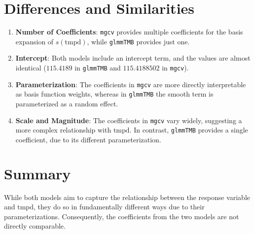 \documentclass{article}
\begin{document}
\section{Differences and Similarities}

\begin{enumerate}
    \item \textbf{Number of Coefficients}: \texttt{mgcv} provides multiple coefficients for the basis expansion of \( s(\text{tmpd}) \), while \texttt{glmmTMB} provides just one.
    \item \textbf{Intercept}: Both models include an intercept term, and the values are almost identical (\(115.4189\) in \texttt{glmmTMB} and \(115.4188502\) in \texttt{mgcv}).
    \item \textbf{Parameterization}: The coefficients in \texttt{mgcv} are more directly interpretable as basis function weights, whereas in \texttt{glmmTMB} the smooth term is parameterized as a random effect.
    \item \textbf{Scale and Magnitude}: The coefficients in \texttt{mgcv} vary widely, suggesting a more complex relationship with \( \text{tmpd} \). In contrast, \texttt{glmmTMB} provides a single coefficient, due to its different parameterization.
\end{enumerate}

\section{Summary}

While both models aim to capture the relationship between the response variable and \( \text{tmpd} \), they do so in fundamentally different ways due to their parameterizations. Consequently, the coefficients from the two models are not directly comparable. 
\end{document}
